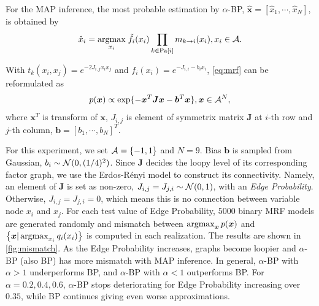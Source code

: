 \documentclass{article}
\begin{document}
For the MAP inference, the most probable estimation by $\alpha$-BP, $\hat{\bm{x}}=[\hat{x}_1, \cdots, \hat{x}_N]$, is obtained by
\begin{align}
  \hat{x}_{i} = \underset{x_i}{\operatorname{argmax}}\;\tilde{f}_i(x_i) \prod_{k\in \text{Pa}[i]} m_{k\rightarrow i}(x_i), x_i \in \mathcal{A}.
\end{align}




With $t_k(x_i, x_j) = e^{-2J_{i,j}x_i x_j}$ and $f_i(x_i) = e^{-J_{i,i}-b_i x_i}$, \autoref{eq:mrf} can be reformulated as
\begin{equation}
  p(\bm{x}) \propto \exp\{-\bm{x}^{T}\bm{J}\bm{x} - \bm{b}^{T}\bm{x}\}, \bm{x} \in \mathcal{A}^N,
\end{equation}
where $\bm{x}^{T}$ is transform of $\bm{x}$, $J_{i,j}$ is element of symmetrix matrix $\bm{J}$ at $i$-th row and $j$-th column, $\bm{b} = [b_1, \cdots, b_N]^T$.


For this experiment, we set $\mathcal{A} = \left\{ -1, 1 \right\}$ and $N=9$. Bias $\bm{b}$ is sampled from Gaussian, ${b_i} \sim \mathcal{N}(0, (1/4)^2)$. Since $\bm{J}$ decides the loopy level of its corresponding factor graph, we use the Erdos-Rényi model \cite{erdos1960} to construct its connectivity. Namely, an element of $\bm{J}$ is set as non-zero, $ {J}_{i,j} = {J}_{j,i} \sim \mathcal{N}(0,1)$, with an \textit{Edge Probability}. Otherwise, ${J}_{i, j} = {J}_{j,i} = 0$, which means this is no connection between variable node $x_i$ and $x_j$. For each test value of Edge Probability, $5000$ binary MRF models are generated randomly and mismatch between $\operatorname{argmax}_{\bm{x}} p(\bm{x})$ and $\left\{ \bm{x}|\operatorname{argmax}_{x_i}q_i(x_i) \right\}$ is computed in each realization. The results are shown in \autoref{fig:mismatch}. As the Edge Probability increases, graphs become loopier and $\alpha$-BP (also BP) has more mismatch with MAP inference. In general, $\alpha$-BP with $\alpha > 1$ underperforms BP, and $\alpha$-BP with $\alpha < 1$ outperforms BP. For $\alpha=0.2, 0.4, 0.6$, $\alpha$-BP stops deteriorating for Edge Probability increasing over $0.35$, while BP continues giving even worse approximations.
\end{document}
